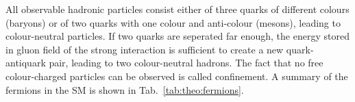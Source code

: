All observable hadronic particles consist either of three quarks of different colours (baryons) or of two quarks with one colour and anti-colour (mesons), leading to colour-neutral particles. If two quarks are seperated far enough, the energy stored in gluon field of the strong interaction is sufficient to create a new quark-antiquark pair, leading to two colour-neutral hadrons. The fact that no free colour-charged particles can be observed is called confinement. A summary of the fermions in the SM is shown in Tab.~\ref{tab:theo:fermions}.\\

